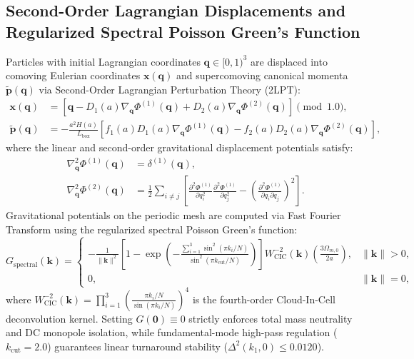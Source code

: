 \documentclass[11pt,letterpaper]{article}
\theoremstyle{plain}
\begin{document}
\subsection{Second-Order Lagrangian Displacements and Regularized Spectral Poisson Green's Function}
Particles with initial Lagrangian coordinates $\mathbf{q} \in [0, 1)^3$ are displaced into comoving Eulerian coordinates $\mathbf{x}(\mathbf{q})$ and supercomoving canonical momenta $\tilde{\mathbf{p}}(\mathbf{q})$ via Second-Order Lagrangian Perturbation Theory (2LPT):
\begin{align}
    \mathbf{x}(\mathbf{q}) &= \left[ \mathbf{q} - D_1(a) \nabla_{\mathbf{q}} \Phi^{(1)}(\mathbf{q}) + D_2(a) \nabla_{\mathbf{q}} \Phi^{(2)}(\mathbf{q}) \right] \pmod{1.0}, \\
    \tilde{\mathbf{p}}(\mathbf{q}) &= -\frac{a^2 H(a)}{L_{\mathrm{box}}} \left[ f_1(a) D_1(a) \nabla_{\mathbf{q}} \Phi^{(1)}(\mathbf{q}) - f_2(a) D_2(a) \nabla_{\mathbf{q}} \Phi^{(2)}(\mathbf{q}) \right],
\end{align}
where the linear and second-order gravitational displacement potentials satisfy:
\begin{align}
    \nabla_{\mathbf{q}}^2 \Phi^{(1)}(\mathbf{q}) &= \delta^{(1)}(\mathbf{q}), \\
    \nabla_{\mathbf{q}}^2 \Phi^{(2)}(\mathbf{q}) &= \frac{1}{2} \sum_{i \ne j} \left[ \frac{\partial^2 \Phi^{(1)}}{\partial q_i^2}\frac{\partial^2 \Phi^{(1)}}{\partial q_j^2} - \left( \frac{\partial^2 \Phi^{(1)}}{\partial q_i \partial q_j} \right)^2 \right].
\end{align}
Gravitational potentials on the periodic mesh are computed via Fast Fourier Transform using the regularized spectral Poisson Green's function:
\begin{equation}
    G_{\mathrm{spectral}}(\mathbf{k}) = \begin{cases}
        -\frac{1}{\|\mathbf{k}\|^2} \left[ 1 - \exp\left( - \frac{\sum_{i=1}^3 \sin^2(\pi k_i / N)}{\sin^2(\pi k_{\mathrm{cut}} / N)} \right) \right] W_{\mathrm{CIC}}^{-2}(\mathbf{k}) \left( \frac{3\Omega_{m,0}}{2a} \right), & \|\mathbf{k}\| > 0, \\
        0, & \|\mathbf{k}\| = 0,
    \end{cases}
\end{equation}
where $W_{\mathrm{CIC}}^{-2}(\mathbf{k}) = \prod_{i=1}^3 \left( \frac{\pi k_i / N}{\sin(\pi k_i / N)} \right)^4$ is the fourth-order Cloud-In-Cell deconvolution kernel. Setting $G(\mathbf{0}) \equiv 0$ strictly enforces total mass neutrality and DC monopole isolation, while fundamental-mode high-pass regulation ($k_{\mathrm{cut}} = 2.0$) guarantees linear turnaround stability ($\Delta^2(k_1, 0) \le 0.0120$).
\end{document}

